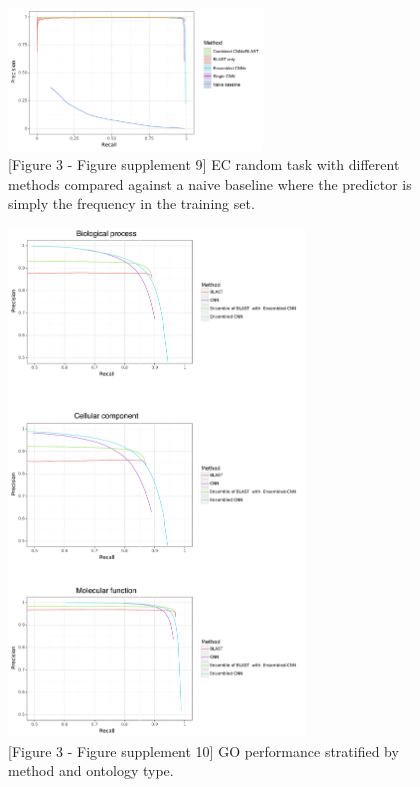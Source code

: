 \begin{figure}[htbp]
\centering
  \includegraphics[width=0.6\textwidth]{random_untruncated.pdf}
  \caption{[Figure 3 - Figure supplement 9] EC random task with different methods compared against a naive baseline where the predictor is simply the frequency in the training set.}
  \label{sup:fig:naive}
\end{figure}


\begin{figure}[htbp]
\centering
  \includegraphics[width=0.7\textwidth]{combined_split_go_random.pdf}
  \caption{[Figure 3 - Figure supplement 10] GO performance stratified by method and ontology type.}
  \label{sup:fig:go_ontologies}
\end{figure}

